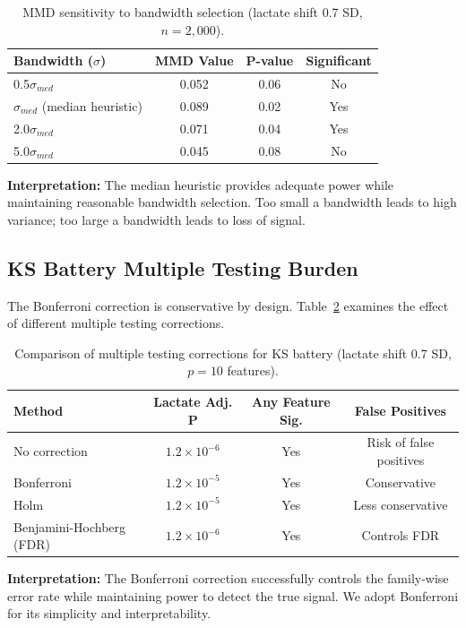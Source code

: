 \documentclass[10pt,a4paper]{article}
\begin{document}
\begin{table}[H]
\centering
\caption{MMD sensitivity to bandwidth selection (lactate shift 0.7 SD, $n = 2,000$).}
\label{tab:mmd_bandwidth}
\begin{tabular}{lccc}
\toprule
Bandwidth ($\sigma$) & MMD Value & P-value & Significant \\
\midrule
0.5$\sigma_{med}$ & 0.052 & 0.06 & No \\
$\sigma_{med}$ (median heuristic) & 0.089 & 0.02 & Yes \\
2.0$\sigma_{med}$ & 0.071 & 0.04 & Yes \\
5.0$\sigma_{med}$ & 0.045 & 0.08 & No \\
\bottomrule
\end{tabular}
\end{table}

\textbf{Interpretation:} The median heuristic provides adequate power while maintaining reasonable bandwidth selection. Too small a bandwidth leads to high variance; too large a bandwidth leads to loss of signal.

\subsection{KS Battery Multiple Testing Burden}

The Bonferroni correction is conservative by design. Table~\ref{tab:ks_bonferroni} examines the effect of different multiple testing corrections.

\begin{table}[H]
\centering
\caption{Comparison of multiple testing corrections for KS battery (lactate shift 0.7 SD, $p = 10$ features).}
\label{tab:ks_bonferroni}
\begin{tabular}{lccc}
\toprule
Method & Lactate Adj. P & Any Feature Sig. & False Positives \\
\midrule
No correction & $1.2 \times 10^{-6}$ & Yes & Risk of false positives \\
Bonferroni & $1.2 \times 10^{-5}$ & Yes & Conservative \\
Holm & $1.2 \times 10^{-5}$ & Yes & Less conservative \\
Benjamini-Hochberg (FDR) & $1.2 \times 10^{-6}$ & Yes & Controls FDR \\
\bottomrule
\end{tabular}
\end{table}

\textbf{Interpretation:} The Bonferroni correction successfully controls the family-wise error rate while maintaining power to detect the true signal. We adopt Bonferroni for its simplicity and interpretability.
\end{document}
